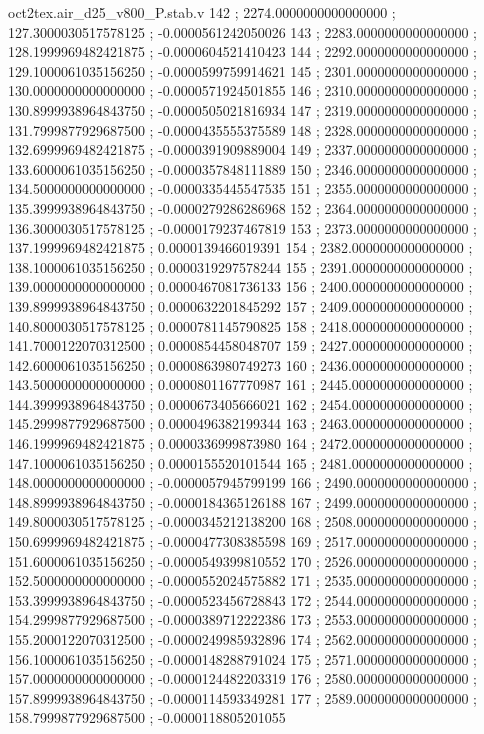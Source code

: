 \begin{filecontents}[overwrite]{oct2tex.air_d25_v800_P.stab.v}
142 ; 2274.0000000000000000 ; 127.3000030517578125 ; -0.0000561242050026
143 ; 2283.0000000000000000 ; 128.1999969482421875 ; -0.0000604521410423
144 ; 2292.0000000000000000 ; 129.1000061035156250 ; -0.0000599759914621
145 ; 2301.0000000000000000 ; 130.0000000000000000 ; -0.0000571924501855
146 ; 2310.0000000000000000 ; 130.8999938964843750 ; -0.0000505021816934
147 ; 2319.0000000000000000 ; 131.7999877929687500 ; -0.0000435555375589
148 ; 2328.0000000000000000 ; 132.6999969482421875 ; -0.0000391909889004
149 ; 2337.0000000000000000 ; 133.6000061035156250 ; -0.0000357848111889
150 ; 2346.0000000000000000 ; 134.5000000000000000 ; -0.0000335445547535
151 ; 2355.0000000000000000 ; 135.3999938964843750 ; -0.0000279286286968
152 ; 2364.0000000000000000 ; 136.3000030517578125 ; -0.0000179237467819
153 ; 2373.0000000000000000 ; 137.1999969482421875 ; 0.0000139466019391
154 ; 2382.0000000000000000 ; 138.1000061035156250 ; 0.0000319297578244
155 ; 2391.0000000000000000 ; 139.0000000000000000 ; 0.0000467081736133
156 ; 2400.0000000000000000 ; 139.8999938964843750 ; 0.0000632201845292
157 ; 2409.0000000000000000 ; 140.8000030517578125 ; 0.0000781145790825
158 ; 2418.0000000000000000 ; 141.7000122070312500 ; 0.0000854458048707
159 ; 2427.0000000000000000 ; 142.6000061035156250 ; 0.0000863980749273
160 ; 2436.0000000000000000 ; 143.5000000000000000 ; 0.0000801167770987
161 ; 2445.0000000000000000 ; 144.3999938964843750 ; 0.0000673405666021
162 ; 2454.0000000000000000 ; 145.2999877929687500 ; 0.0000496382199344
163 ; 2463.0000000000000000 ; 146.1999969482421875 ; 0.0000336999873980
164 ; 2472.0000000000000000 ; 147.1000061035156250 ; 0.0000155520101544
165 ; 2481.0000000000000000 ; 148.0000000000000000 ; -0.0000057945799199
166 ; 2490.0000000000000000 ; 148.8999938964843750 ; -0.0000184365126188
167 ; 2499.0000000000000000 ; 149.8000030517578125 ; -0.0000345212138200
168 ; 2508.0000000000000000 ; 150.6999969482421875 ; -0.0000477308385598
169 ; 2517.0000000000000000 ; 151.6000061035156250 ; -0.0000549399810552
170 ; 2526.0000000000000000 ; 152.5000000000000000 ; -0.0000552024575882
171 ; 2535.0000000000000000 ; 153.3999938964843750 ; -0.0000523456728843
172 ; 2544.0000000000000000 ; 154.2999877929687500 ; -0.0000389712222386
173 ; 2553.0000000000000000 ; 155.2000122070312500 ; -0.0000249985932896
174 ; 2562.0000000000000000 ; 156.1000061035156250 ; -0.0000148288791024
175 ; 2571.0000000000000000 ; 157.0000000000000000 ; -0.0000124482203319
176 ; 2580.0000000000000000 ; 157.8999938964843750 ; -0.0000114593349281
177 ; 2589.0000000000000000 ; 158.7999877929687500 ; -0.0000118805201055

\end{filecontents}

